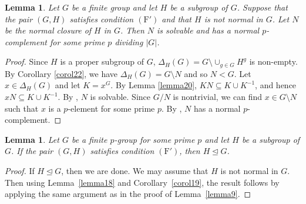 \documentclass[twoside,a4paper,reqno,11pt]{amsart}
\newcommand{\<}{\langle}
\renewcommand{\>}{\rangle}
\newcommand{\Fp}{\mathrm{(F')}}
\renewcommand{\:}{\colon}
\newtheorem{lem}[thm]{Lemma}
\theoremstyle{definition}
\begin{document}
\begin{lem}\label{lemma23}
Let $G$ be a finite group and let $H$ be a subgroup of $G$.	Suppose that the pair $(G,H)$ satisfies condition $\Fp$ and that $H$ is not normal in $G$. Let $N$ be the normal closure of $H$ in $G$. Then $N$ is solvable and has a normal $p$-complement for some prime $p$ dividing $|G|$.
\end{lem}
\begin{proof}
	Since $H$ is a proper subgroup of $G$,  $\Delta_H(G)=G\setminus \cup_{g\in G}H^g$ is non-empty. By Corollary \ref{corol22}, we have $\Delta_H(G)=G\setminus N$ and so $N<G$. Let $x\in \Delta_H(G)$ and let $K=x^G$. By Lemma \ref{lemma20}, $KN \subseteq K\cup K^{-1}$, and hence $xN\subseteq K\cup K^{-1}$.  By \cite[Theorem 3.3(a)]{Beltran}, $N$ is solvable. Since $G/N$ is nontrivial, we can find $x\in G\setminus N$ such that $x$ is a $p$-element for some prime $p$. By \cite[Theorem 3.3(c)]{Beltran}, $N$ has a normal $p$-complement. 
\end{proof}

\begin{lem}\label{lemma24}
Let $G$ be a finite $p$-group for some prime $p$ and let $H$ be a subgroup of $G$.	If the pair $(G,H)$ satisfies  condition $\Fp$, then $H\unlhd G$. 
\end{lem}
\begin{proof}
	If $H\unlhd G$, then we are done. We may assume that $H$ is not normal in $G$. Then using Lemma~\ref{lemma18} and Corollary~\ref{corol19}, the result follows by applying the same argument as in the proof of Lemma~\ref{lemma9}. 
\end{proof}
\end{document}
